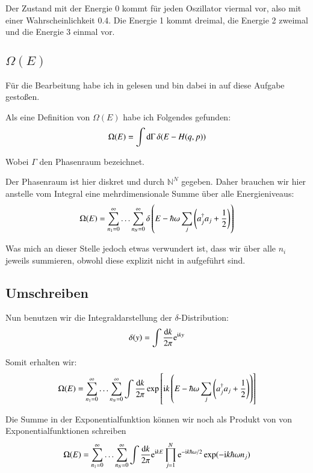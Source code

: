 Der Zustand mit der Energie 0 kommt für jeden Oszillator viermal vor, also mit
einer Wahrscheinlichkeit \num{.4}. Die Energie 1 kommt dreimal, die Energie 2
zweimal und die Energie 3 einmal vor.

\subsection{$\Omega(E)$}

Für die Bearbeitung habe ich in \cite{Schwabl/Statistische_Mechanik} gelesen
und bin dabei in \cite[Abschnitt~2.2.3.1]{Schwabl/Statistische_Mechanik} auf
diese Aufgabe gestoßen.

Als eine Definition von $\Omega(E)$ habe ich Folgendes gefunden: \parencite[Formel~2.2.4]{Schwabl/Statistische_Mechanik}
\[
    \Omega(E) = \int \dif \Gamma \, \delta(E - H(q, p))
\]

Wobei $\Gamma$ den Phasenraum bezeichnet.

Der Phasenraum ist hier diskret und durch $\mathbb N^N$ gegeben. Daher brauchen wir hier anstelle vom Integral eine mehrdimensionale Summe über alle Energieniveaus:
\[
    \Omega(E) =
    \sum_{n_1=0}^\infty
    \ldots
    \sum_{n_N=0}^\infty
    \delta\del{
        E - \hbar\omega \sum_j \del{a_j^\dagger a_j + \frac12}
    }
\]

Was mich an dieser Stelle jedoch etwas verwundert ist, dass wir über alle $n_i$ jeweils summieren, obwohl diese explizit nicht in \cite[Formel~2.2.25]{Schwabl/Statistische_Mechanik} aufgeführt sind.

\subsection{Umschreiben}

Nun benutzen wir die Integraldarstellung der $\delta$-Distribution:\parencite[Formel~2.2.4]{Schwabl/Statistische_Mechanik}
\[
    \delta(y) = \int \frac{\dif k}{2 \pi} \eup^{\iup k y}
\]

Somit erhalten wir:
\[
    \Omega(E) =
    \sum_{n_1=0}^\infty
    \ldots
    \sum_{n_N=0}^\infty
    \int \frac{\dif k}{2 \pi}
    \exp\sbr{
        \iup k \del{
            E - \hbar\omega \sum_j \del{a_j^\dagger a_j + \frac12}
        }
    }
\]

Die Summe in der Exponentialfunktion können wir noch als Produkt von von Exponentialfunktionen schreiben
\[
    \Omega(E) =
    \sum_{n_1=0}^\infty
    \ldots
    \sum_{n_N=0}^\infty
    \int \frac{\dif k}{2 \pi}
    \eup^{\iup k E}
    \prod_{j=1}^N
    \eup^{-\iup k \hbar\omega /2}
    \exp( - \iup k \hbar\omega n_j )
\]

